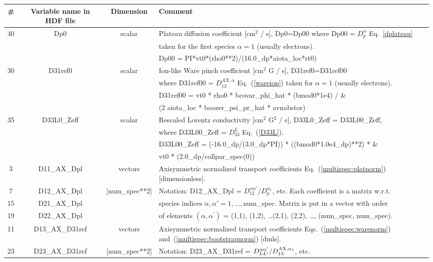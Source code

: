 \documentclass[preprint,prb,aps]{revtex4-1}
\newcommand{\red}[1]{{\color{red} #1}}
\newcommand{\eq}[1]{(\ref{#1})}
\begin{document}
\begin{table}[h]
\begin{tabular}{|c|c|c|l|}
\hline
\hline
\# & Variable name in HDF file & Dimension  & Comment \\
\hline
\hline
%
40 & Dp0 & scalar & Plateau diffusion coefficient [cm$^2$ / s], Dp0=Dp00 where Dp00 = $D_p^\alpha$ Eq.~\eqref{dplateau}\\
 & & & taken for the first species $\alpha=1$ (usually electrons). \\
 & & & Dp00 = PI*vt0*(rho0**2)/(16.0\_dp*aiota\_loc*rt0) \\
\hline
%
30 & D31ref0 & scalar &  Ion-like Ware pinch coefficient \red{[cm$^2$ G / s]}, D31ref0=D31ref00  \\
 & & & where D31ref00 = $D_{13}^{AX,\alpha}$ Eq.~\eq{wareion} taken for $\alpha=1$ (usually electrons). \\
 & & & D31ref00 = vt0 * rho0 * bcovar\_phi\_hat * (bmod0*1e4) / \& \\
 & & & (2 aiota\_loc * boozer\_psi\_pr\_hat * avnabstor) \\
\hline
%
35 & D33L0\_Zeff & scalar & Rescaled Lorentz conductivity \red{[cm$^2$ G$^2$ / s]}, D33L0\_Zeff = D33L00\_Zeff, \\
 & & & where D33L00\_Zeff = $D_{33}^L$ Eq.~\eq{D33L}.\\
 & & & D33L00\_Zeff = (-16.0\_dp/(3.0\_dp*PI)) * ((bmod0*1.0e4\_dp)**2) * \& \\
 & & & vt0 * (2.0\_dp/collpar\_spec(0)) \\
\hline
\hline
%
3 & D11\_AX\_Dpl & vectors &
Axisymmetric normalized transport coefficients Eq.~\eq{multispec:platnorm} [dimensionless].
\\
7 & D12\_AX\_Dpl & [num\_spec**2] &
Notation: D12\_AX\_Dpl = $D_{12}^{\alpha \alpha'}/D_p^{\alpha_1}$, etc.
Each coefficient is a matrix w.r.t.
\\
15 & D21\_AX\_Dpl & &
species indices $\alpha, \alpha' = 1,\dots,$num\_spec. Matrix is put in a vector
with order
\\
19 & D22\_AX\_Dpl & &
of elements
\red{
$(\alpha,\alpha^\prime)$ = (1,1), (1,2), \dots (2,1), (2,2), \dots, (num\_spec, num\_spec).
}
\\
\hline
%
11 & D13\_AX\_D31ref & vectors &
Axisymmetric normalized transport coefficients Eqs.~\eq{multispec:warenorm}
and~\eq{multispec:bootstrapnorm} [dmls].
\\
23 & D23\_AX\_D31ref &  [num\_spec**2] &
Notation: D23\_AX\_D31ref = $D_{LL^\prime}^{\alpha \alpha'}/ D_{13}^{{\rm AX},\alpha_1}$, etc.

\end{tabular}
\end{table}
\end{document}
